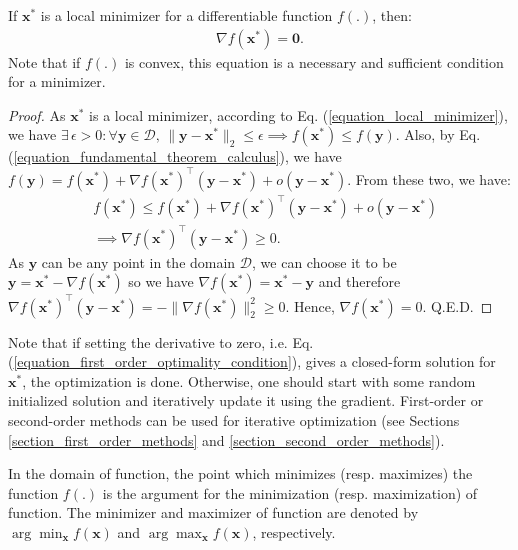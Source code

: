\documentclass[lang=cn,10pt]{gorgeousnbook}
\numberwithin{equation}{section}%
\numberwithin{figure}{section}%
\begin{document}
\begin{lemma}\label{lemma_first_order_optimality_condition}
If $\boldsymbol{x}^*$ is a local minimizer for a differentiable function $f(.)$, then:
\begin{align}\label{equation_first_order_optimality_condition}
\nabla f(\boldsymbol{x}^*) = \boldsymbol{0}.
\end{align}
Note that if $f(.)$ is convex, this equation is a necessary and sufficient condition for a minimizer. 
\end{lemma}
\begin{proof}
As $\boldsymbol{x}^*$ is a local minimizer, according to Eq. (\ref{equation_local_minimizer}), we have $\exists\, \epsilon > 0 : \forall \boldsymbol{y} \in \mathcal{D},\, \|\boldsymbol{y} - \boldsymbol{x}^*\|_2 \leq \epsilon \implies f(\boldsymbol{x}^*) \leq f(\boldsymbol{y})$.
Also, by Eq. (\ref{equation_fundamental_theorem_calculus}), we have $f(\boldsymbol{y}) = f(\boldsymbol{x}^*) + \nabla f(\boldsymbol{x}^*)^\top (\boldsymbol{y} - \boldsymbol{x}^*) + o(\boldsymbol{y} - \boldsymbol{x}^*)$. From these two, we have:
\begin{align*}
&f(\boldsymbol{x}^*) \leq f(\boldsymbol{x}^*) + \nabla f(\boldsymbol{x}^*)^\top (\boldsymbol{y} - \boldsymbol{x}^*) + o(\boldsymbol{y} - \boldsymbol{x}^*) \\
&\implies \nabla f(\boldsymbol{x}^*)^\top (\boldsymbol{y} - \boldsymbol{x}^*) \geq 0.
\end{align*}
As $\boldsymbol{y}$ can be any point in the domain $\mathcal{D}$, we can choose it to be $\boldsymbol{y} = \boldsymbol{x}^* - \nabla f(\boldsymbol{x}^*)$ so we have $\nabla f(\boldsymbol{x}^*) = \boldsymbol{x}^* - \boldsymbol{y}$ and therefore $\nabla f(\boldsymbol{x}^*)^\top (\boldsymbol{y} - \boldsymbol{x}^*) = -\|\nabla f(\boldsymbol{x}^*)\|_2^2 \geq 0$. Hence, $\nabla f(\boldsymbol{x}^*) = 0$. Q.E.D.
\end{proof}
Note that if setting the derivative to zero, i.e. Eq. (\ref{equation_first_order_optimality_condition}), gives a closed-form solution for $\boldsymbol{x}^*$, the optimization is done. Otherwise, one should start with some random initialized solution and iteratively update it using the gradient. First-order or second-order methods can be used for iterative optimization (see Sections \ref{section_first_order_methods} and \ref{section_second_order_methods}). 

\begin{definition}
In the domain of function, the point which minimizes (resp. maximizes) the function $f(.)$ is the argument for the minimization (resp. maximization) of function. The minimizer and maximizer of function are denoted by $\arg\min_{\boldsymbol{x}} f(\boldsymbol{x})$ and $\arg\max_{\boldsymbol{x}} f(\boldsymbol{x})$, respectively. 
\end{definition}
\end{document}
